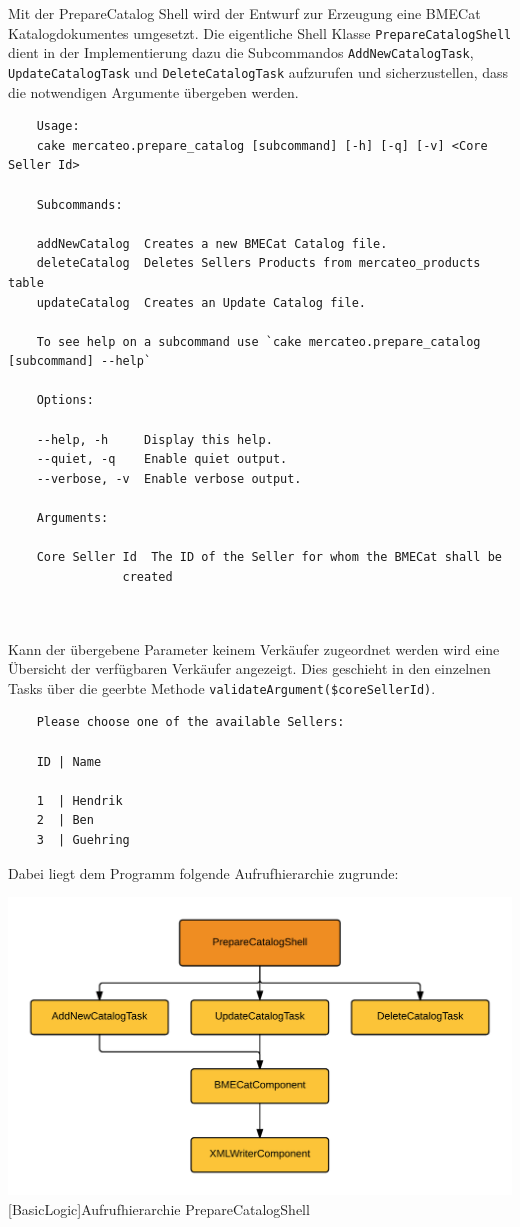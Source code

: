 	Mit der PrepareCatalog Shell wird der Entwurf zur Erzeugung eine BMECat Katalogdokumentes umgesetzt. Die eigentliche Shell Klasse \texttt{PrepareCatalogShell} dient in der Implementierung  dazu die Subcommandos \texttt{AddNewCatalogTask}, \texttt{UpdateCatalogTask} und \texttt{DeleteCatalogTask} aufzurufen und sicherzustellen, dass die notwendigen Argumente übergeben werden.
	\lstset{basicstyle=\scriptsize\ttfamily}
	\begin{lstlisting}
	Usage:
	cake mercateo.prepare_catalog [subcommand] [-h] [-q] [-v] <Core Seller Id>
	
	Subcommands:
	
	addNewCatalog  Creates a new BMECat Catalog file.
	deleteCatalog  Deletes Sellers Products from mercateo_products table
	updateCatalog  Creates an Update Catalog file.
	
	To see help on a subcommand use `cake mercateo.prepare_catalog [subcommand] --help`
	
	Options:
	
	--help, -h     Display this help.
	--quiet, -q    Enable quiet output.
	--verbose, -v  Enable verbose output.
	
	Arguments:
	
	Core Seller Id  The ID of the Seller for whom the BMECat shall be
	            created

	
	\end{lstlisting}
	
	Kann der übergebene Parameter keinem Verkäufer zugeordnet werden wird eine Übersicht der verfügbaren Verkäufer angezeigt. Dies geschieht in den einzelnen Tasks über die geerbte Methode \texttt{validateArgument(\$coreSellerId)}.
	
	\begin{lstlisting}
	Please choose one of the available Sellers:
	
	ID | Name
	
	1  | Hendrik
	2  | Ben
	3  | Guehring
	\end{lstlisting}
	
	Dabei liegt dem Programm folgende Aufrufhierarchie zugrunde:\\
	\begin{minipage}{\linewidth}
		\vspace{1em}
		\centering
		\includegraphics[width=0.7 \linewidth]{img/Aufrufhierarchie}
		[BasicLogic]{Aufrufhierarchie PrepareCatalogShell}
		\vspace{1em}
	\end{minipage}\\
	
